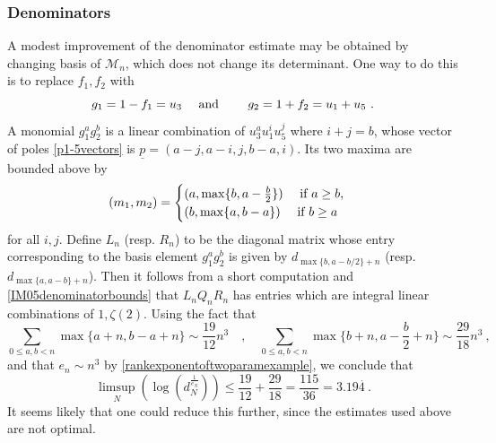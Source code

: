 \documentclass[a4paper,10pt]{amsart}
\theoremstyle{definition}
\theoremstyle{remark}
\numberwithin{equation}{section}
\newcommand{\0}{\color{blue}{\mathsf{0}}}
\begin{document}
\subsubsection{Denominators}
A modest improvement of the denominator estimate may be obtained by changing basis of $\mathcal{M}_n$, which does not change its determinant.  One way to do this is to replace $f_1,f_2$ with 
\[ g_1 = 1-f_1  = u_3   \quad \hbox{ and } \qquad g_2 = 1+f_2 =u_1 +u_5   \ .\]
A monomial $g_1^a g_2^b$ is a linear combination of $u_3^a u_1^i u_5^j$ where $i+j=b$, whose  vector of poles  \eqref{p1-5vectors} is 
$\underline{p}=(a-j,a-i,j,b -a,i) $. Its two maxima are bounded above by
\[(m_1,m_2) = \begin{cases}   ( a, \max\{b,a-\textstyle{\frac{b}{2}}\})  \quad  \hbox{ if }  a\geq b,  \\   (b, \max\{a, b-a\})\quad   \hbox{ if }  b\geq a \end{cases}\]
 for all $i,j$. Define $L_n$ (resp. $R_n$) to be the diagonal matrix whose entry   corresponding to the  basis element $g_1^ag_2^b$ is given by 
 $d_{\max\{b,a-b/2\}+n}$ (resp. $d_{\max\{a,a-b\}+n}$). Then it follows from a short computation and  \eqref{IM05denominatorbounds}  that $L_n Q_n R_n$ has entries which are integral linear combinations of $1, \zeta(2)$. Using the fact that
 \[  \sum_{0\leq a,b<n} \max\{a+n,b-a+n\}  \sim \frac{19}{12} n^3  \quad , \quad  \sum_{0\leq a,b<n} \max\{b+n,a-\displaystyle{\frac{b}{2}}+n\}  \sim \frac{29}{18} n^3 \ ,    \]
 and that $e_n \sim n^3$  by \eqref{rankexponentoftwoparamexample}, we conclude that 
 \[  \limsup_N \left( \log (d_N^{\frac{1}{e_N}}) \right) \leq  \frac{19}{12}+\frac{29}{18}= \frac{115}{36} = 3.19\overset{.}{4} \ . \]
 It seems likely that one could reduce this further, since the  estimates used above  are not optimal.
\end{document}
